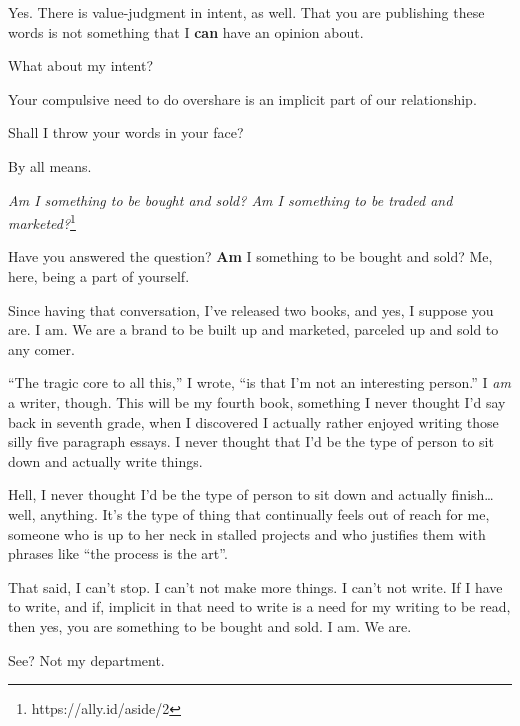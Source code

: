 \begin{paracol}{2}
\begin{leftcolumn}
\begin{ally}
Yes. There is value-judgment in intent, as well. That you are publishing these words is not something that I \textbf{can} have an opinion about.
\end{ally}
What about my intent?

\begin{ally}
Your compulsive need to do overshare is an implicit part of our relationship.
\end{ally}
Shall I throw your words in your face?

\begin{ally}
By all means.
\end{ally}
\emph{Am I something to be bought and sold? Am I something to be traded and marketed?}\footnote{https://ally.id/aside/2}

\begin{ally}
Have you answered the question? \textbf{Am} I something to be bought and sold? Me, here, being a part of yourself.
\end{ally}
Since having that conversation, I've released two books, and yes, I suppose you are. I am. We are a brand to be built up and marketed, parceled up and sold to any comer.

``The tragic core to all this,'' I wrote, ``is that I'm not an interesting person.'' I \emph{am} a writer, though. This will be my fourth book, something I never thought I'd say back in seventh grade, when I discovered I actually rather enjoyed writing those silly five paragraph essays. I never thought that I'd be the type of person to sit down and actually write things.

Hell, I never thought I'd be the type of person to sit down and actually finish\ldots{}well, anything. It's the type of thing that continually feels out of reach for me, someone who is up to her neck in stalled projects and who justifies them with phrases like ``the process is the art''.

That said, I can't stop. I can't not make more things. I can't not write. If I have to write, and if, implicit in that need to write is a need for my writing to be read, then yes, you are something to be bought and sold. I am. We are.

\begin{ally}
See? Not my department.
\end{ally}
\newpage
  \end{leftcolumn}
\end{paracol}
